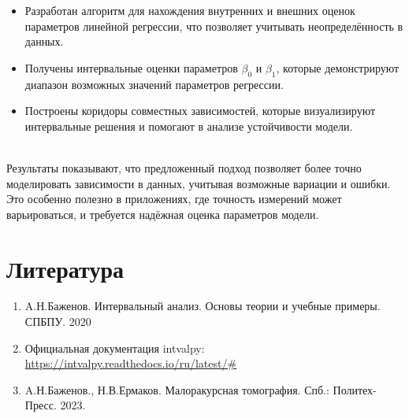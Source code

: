 \documentclass[10pt]{article}
\begin{document}
  \begin{itemize}
    \item Разработан алгоритм для нахождения внутренних и внешних оценок
      параметров линейной регрессии, что позволяет учитывать
      неопределённость в данных.
    \item Получены интервальные оценки параметров \( \beta_0 \) и
      \( \beta_1 \), которые демонстрируют диапазон возможных значений
      параметров регрессии.
    \item Построены коридоры совместных зависимостей, которые
      визуализируют интервальные решения и помогают в анализе устойчивости
      модели.
  \end{itemize}\\
  Результаты показывают, что предложенный подход позволяет более точно
  моделировать зависимости в данных, учитывая возможные вариации и ошибки.
  Это особенно полезно в приложениях, где точность измерений может
  варьироваться, и требуется надёжная оценка параметров модели.
\section{Литература}
\begin{enumerate}
    \item A.Н.Баженов. Интервальный анализ. Основы теории и учебные примеры. СПБПУ. 2020
    \item Официальная документация intvalpy: \url{https://intvalpy.readthedocs.io/ru/latest/#} 
    \item A.Н.Баженов., Н.В.Ермаков. Малоракурсная томография. Спб.: Политех-Пресс. 2023.  
\end{enumerate}
\end{document}
